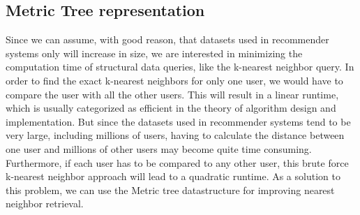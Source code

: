 \subsection{Metric Tree representation}
  Since we can assume, with good reason, that datasets used in recommender systems only will increase in size, we are interested in minimizing the computation time of structural data queries, like the k-nearest neighbor query. In order to find the exact k-nearest neighbors for only one user, we would have to compare the user with all the other users. This will result in a linear runtime, which is usually categorized as efficient in the theory of algorithm design and implementation. But since the datasets used in recommender systems tend to be very large, including millions of users, having to calculate the distance between one user and millions of other users may become quite time consuming. Furthermore, if each user has to be compared to any other user, this brute force k-nearest neighbor approach will lead to a quadratic runtime. As a solution to this problem, we can use the Metric tree datastructure for improving nearest neighbor retrieval.       
